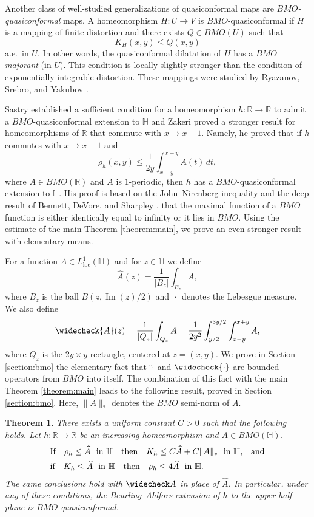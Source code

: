 \documentclass{amsart}
\theoremstyle{plain}
\newtheorem{theorem}{Theorem}
\theoremstyle{definition}
\theoremstyle{remark}
\numberwithin{equation}{section}
\numberwithin{theorem}{section}
\numberwithin{conjecture}{section}
\newcommand{\R}{\mathbb R}
\newcommand{\1}{\mathbf 1}
\newcommand{\UHP}{\mathbb H}
\DeclareMathOperator{\im}{{\mathrm{Im}}}
\DeclareMathOperator{\loc}{\mathrm{loc}}
\begin{document}
Another class of well-studied generalizations of quasiconformal maps are \textit{$BMO$-quasiconformal} maps. A homeomorphism $H\colon U\to V$ is $BMO$-quasiconformal if $H$ is a mapping of finite distortion and there exists $Q\in BMO(U)$ such that
$$K_H(x,y)\leq Q(x,y)$$
a.e.\ in $U$. In other words, the quasiconformal dilatation of $H$ has a $BMO$ \textit{majorant} (in $U$). This condition is locally slightly stronger than the condition of exponentially integrable distortion. These mappings were studied by Ryazanov, Srebro, and Yakubov \cite{RyazanovSrebroYakubov:BMO}. 

Sastry \cite[Theorem 3.1]{Sastry:boundaryBMO} established a sufficient condition for a homeomorphism $h\colon \R\to \R$ to admit a $BMO$-quasiconformal extension to $\UHP$ and Zakeri \cite[Theorem C]{Zakeri:boundary} proved a stronger result for homeomorphisms of $\R$ that commute with $x\mapsto x+1$. Namely, he proved that if $h$ commutes with $x\mapsto x+1$ and 
$$\rho_h(x,y) \leq \frac{1}{2y}\int_{x-y}^{x+y} A(t)\, dt,$$
where $A\in BMO(\R)$ and $A$ is $1$-periodic, then $h$ has a $BMO$-quasiconformal extension to $\UHP$.  His proof is based on the John--Nirenberg inequality \cite{JohnNirenberg:bmo} and the deep result of Bennett, DeVore, and Sharpley \cite{BennetDeVoreSharpley:bmo}, that the maximal function of a $BMO$ function is either identically equal to infinity or it lies in $BMO$.  {Using the estimate of the main Theorem \ref{theorem:main}, we prove an even stronger result with elementary means.}

For a function $A\in L^1_{\loc}(\UHP)$ and for $z\in \UHP$ we define 
$$\widehat{A}(z) = \frac{1}{|B_z|} \int_{B_z} A,$$
where $B_z$ is the ball $B(z, \im(z)/2)$ and $|\cdot |$ denotes the Lebesgue measure. We also define 
$$\widecheck{A}(z)= \frac{1}{|Q_z|}\int_{Q_z} A= \frac{1}{2y^2} \int_{y/2}^{3y/2}\int_{x-y}^{x+y} A,$$
where $Q_z$ is the $2y \times y$ rectangle, centered at $z=(x,y)$. We prove in Section \ref{section:bmo} the elementary fact that  $\widehat{\cdot}$ and $\widecheck{\cdot}$ are bounded operators from $BMO$ into itself. The combination of this fact with the main Theorem \ref{theorem:main} leads to the following result, proved in Section \ref{section:bmo}. Here, $\|A\|_*$ denotes the $BMO$ semi-norm of $A$.

\begin{theorem}\label{theorem:bmo}
There exists a uniform constant $C>0$ such that the following holds. Let $h\colon \R \to \R$ be an increasing homeomorphism and $A\in BMO(\UHP)$. 
\begin{align*}
&\textrm{If} \quad \rho_h\leq \widehat{A} \textrm{\,\, in $\UHP$} \quad \textrm{then}\quad K_h \leq C\widehat{A} +C\|A\|_* \textrm{\,\, in $\UHP$,}\quad \textrm{and}\\
&\textrm{if} \quad  K_h\leq \widehat{A} \textrm{\,\, in $\UHP$} \quad \textrm{then}\quad \rho_h \leq 4\widehat{A} \textrm{\,\, in $\UHP$}.
\end{align*}
The same conclusions hold with $\widecheck A$ in place of $\widehat{A}$. In particular, under any of these conditions, the Beurling--Ahlfors extension of $h$ to the upper half-plane is $BMO$-quasiconformal. 
\end{theorem}
\end{document}
